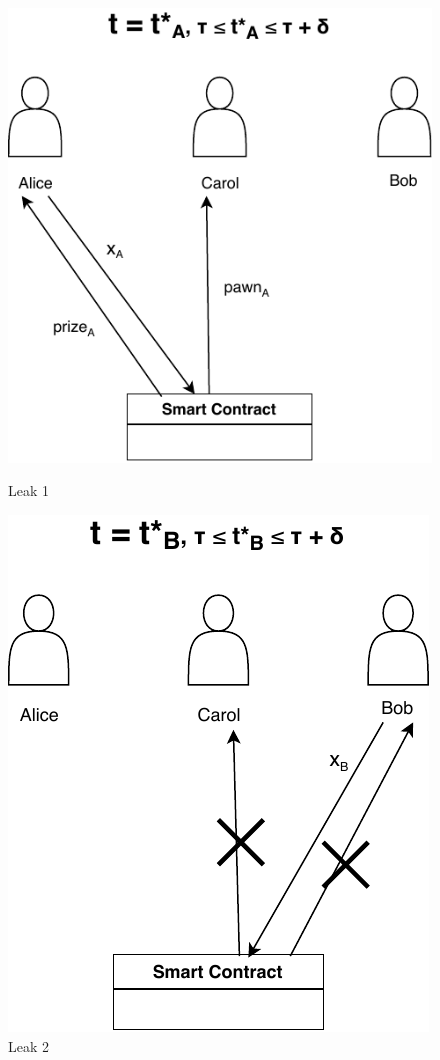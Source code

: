 \begin{figure}[H]
	\begin{minipage}{0.5\textwidth}
		\centering
		\includegraphics[width=.8\linewidth]{images/chap_protocollo/avanzato-leak-2-a.pdf}
		\caption{Leak 1}
	\end{minipage}\hfill
	\begin{minipage}{0.5\textwidth}
		\centering
		\includegraphics[width=.71\linewidth]{images/chap_protocollo/avanzato-leak-2-b.pdf}
		\caption{Leak 2}
	\end{minipage}
\end{figure}

